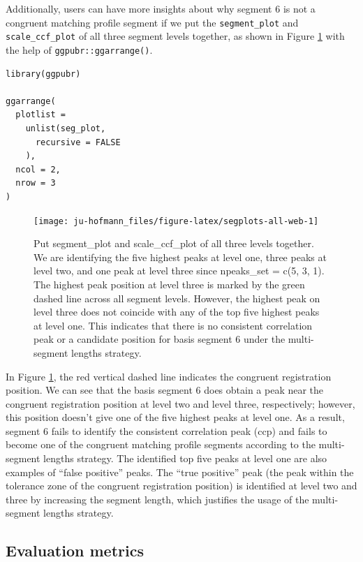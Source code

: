 Additionally, users can have more insights about why segment 6 is not a congruent matching profile segment if we put the \texttt{segment\_plot} and \texttt{scale\_ccf\_plot} of all three segment levels together, as shown in Figure \ref{fig:segplots-all-web} with the help of \texttt{ggpubr::ggarrange()}.

\begin{verbatim}
library(ggpubr)

ggarrange(
  plotlist =
    unlist(seg_plot,
      recursive = FALSE
    ),
  ncol = 2,
  nrow = 3
)
\end{verbatim}

\begin{figure}

{\centering \texttt{[image: ju-hofmann\_files/figure-latex/segplots-all-web-1]} 

}

\caption{Put segment\_plot and scale\_ccf\_plot of all three levels together. We are identifying the five highest peaks at level one, three peaks at level two, and one peak at level three since npeaks\_set = c(5, 3, 1). The highest peak position at level three is marked by the green dashed line across all segment levels. However, the highest peak on level three does not coincide with any of the top five highest peaks at level one. This indicates that there is no consistent correlation peak or a candidate position for basis segment 6 under the multi-segment lengths strategy.}\label{fig:segplots-all-web}
\end{figure}

In Figure \ref{fig:segplots-all-web}, the red vertical dashed line indicates the congruent registration position.
We can see that the basis segment 6 does obtain a peak near the congruent registration position at level two and level three, respectively; however, this position doesn't give one of the five highest peaks at level one.
As a result, segment 6 fails to identify the consistent correlation peak (ccp) and fails to become one of the congruent matching profile segments according to the multi-segment lengths strategy.
The identified top five peaks at level one are also examples of ``false positive'' peaks.
The ``true positive'' peak (the peak within the tolerance zone of the congruent registration position) is identified at level two and three by increasing the segment length, which justifies the usage of the multi-segment lengths strategy.

\hypertarget{evaluation-metrics}{%
\subsection{Evaluation metrics}\label{evaluation-metrics}}


